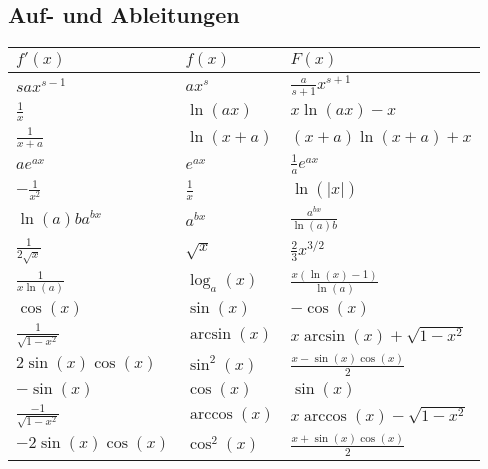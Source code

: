 \subsection{Auf- und Ableitungen}
\begin{tabular}{l | l | l}
    $f'(x)$ & $f(x)$ & $F(x)$\\
    \hline
    $sax^{s-1}$                                                      & $ax^s$                  & $\frac{a}{s + 1}x^{s + 1}$\\
    $\frac{1}{x}$                                                    & $\ln(ax)$               & $x \ln(ax) - x$\\
    $\frac{1}{x + a}$                                                & $\ln(x + a)$            & $(x + a) \ln(x + a) + x$\\
    $ae^{ax}$                                                        & $e^{ax}$                & $\frac{1}{a} e^{ax}$\\
    $-\frac{1}{x^2}$                                                 & $\frac{1}{x}$           & $\ln(|x|)$\\
    $\ln(a)b a^{b x}$                                                & $a^{bx}$                & $\frac{a^{bx}}{\ln(a)b}$\\
    $\frac{1}{2\sqrt{x}}$                                            & $\sqrt{x}$              & $\frac{2}{3}x^{3/2}$\\
    $\frac{1}{x\ln(a)}$                                              & $\log_a(x)$             & $\frac{x(\ln(x)-1)}{\ln(a)}$\\
    $\cos(x)$                                                        & $\sin(x)$               & $-\cos(x)$\\
    $\frac{1}{\sqrt{1-x^2} }$                                        & $\arcsin(x)$            & $x \arcsin(x) + \sqrt{1 - x^2}$\\
    $2 \sin(x) \cos(x)$                                              & $\sin^2(x)$             & $\frac{x - \sin(x) \cos(x)}{2}$\\
    $-\sin(x)$                                                       & $\cos(x)$               & $\sin(x)$\\
    $\frac{-1}{\sqrt{1-x^2} }$                                       & $\arccos(x)$            & $x \arccos(x) - \sqrt{1 - x^2}$\\
    $-2 \sin(x) \cos(x)$                                             & $\cos^2(x)$             & $\frac{x + \sin(x) \cos(x)}{2}$\\

\end{tabular}
